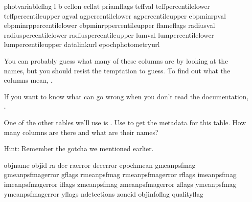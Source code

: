 \documentclass[letterpaper,10pt,english]{sphinxmanual}
\begin{document}
\begin{sphinxVerbatim}[commandchars=\\\{\}]
phot\PYGZus{}variable\PYGZus{}flag
l
b
ecl\PYGZus{}lon
ecl\PYGZus{}lat
priam\PYGZus{}flags
teff\PYGZus{}val
teff\PYGZus{}percentile\PYGZus{}lower
teff\PYGZus{}percentile\PYGZus{}upper
a\PYGZus{}g\PYGZus{}val
a\PYGZus{}g\PYGZus{}percentile\PYGZus{}lower
a\PYGZus{}g\PYGZus{}percentile\PYGZus{}upper
e\PYGZus{}bp\PYGZus{}min\PYGZus{}rp\PYGZus{}val
e\PYGZus{}bp\PYGZus{}min\PYGZus{}rp\PYGZus{}percentile\PYGZus{}lower
e\PYGZus{}bp\PYGZus{}min\PYGZus{}rp\PYGZus{}percentile\PYGZus{}upper
flame\PYGZus{}flags
radius\PYGZus{}val
radius\PYGZus{}percentile\PYGZus{}lower
radius\PYGZus{}percentile\PYGZus{}upper
lum\PYGZus{}val
lum\PYGZus{}percentile\PYGZus{}lower
lum\PYGZus{}percentile\PYGZus{}upper
datalink\PYGZus{}url
epoch\PYGZus{}photometry\PYGZus{}url
\end{sphinxVerbatim}

You can probably guess what many of these columns are by looking at the names, but you should resist the temptation to guess.
To find out what the columns mean, .

If you want to know what can go wrong when you don’t read the documentation, .

 One of the other tables we’ll use is .  Use  to get the metadata for this table.  How many columns are there and what are their names?

Hint: Remember the gotcha we mentioned earlier.

\begin{sphinxVerbatim}[commandchars=\\\{\}]

   
\end{sphinxVerbatim}

\begin{sphinxVerbatim}[commandchars=\\\{\}]
obj\PYGZus{}name
obj\PYGZus{}id
ra
dec
ra\PYGZus{}error
dec\PYGZus{}error
epoch\PYGZus{}mean
g\PYGZus{}mean\PYGZus{}psf\PYGZus{}mag
g\PYGZus{}mean\PYGZus{}psf\PYGZus{}mag\PYGZus{}error
g\PYGZus{}flags
r\PYGZus{}mean\PYGZus{}psf\PYGZus{}mag
r\PYGZus{}mean\PYGZus{}psf\PYGZus{}mag\PYGZus{}error
r\PYGZus{}flags
i\PYGZus{}mean\PYGZus{}psf\PYGZus{}mag
i\PYGZus{}mean\PYGZus{}psf\PYGZus{}mag\PYGZus{}error
i\PYGZus{}flags
z\PYGZus{}mean\PYGZus{}psf\PYGZus{}mag
z\PYGZus{}mean\PYGZus{}psf\PYGZus{}mag\PYGZus{}error
z\PYGZus{}flags
y\PYGZus{}mean\PYGZus{}psf\PYGZus{}mag
y\PYGZus{}mean\PYGZus{}psf\PYGZus{}mag\PYGZus{}error
y\PYGZus{}flags
n\PYGZus{}detections
zone\PYGZus{}id
obj\PYGZus{}info\PYGZus{}flag
quality\PYGZus{}flag
\end{sphinxVerbatim}
\end{document}
